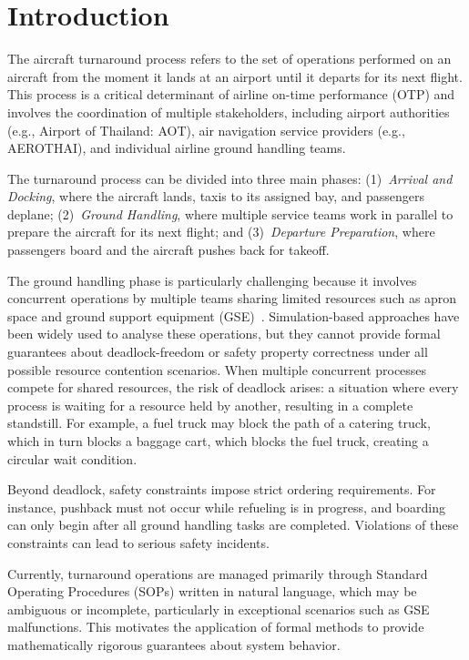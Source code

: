 \documentclass[conference]{IEEEtran}
\begin{document}
\section{Introduction}

The aircraft turnaround process refers to the set of operations performed on an
aircraft from the moment it lands at an airport until it departs for its next
flight. This process is a critical determinant of airline on-time performance
(OTP) and involves the coordination of multiple stakeholders, including airport
authorities (e.g., Airport of Thailand: AOT), air navigation service providers
(e.g., AEROTHAI), and individual airline ground handling teams.

The turnaround process can be divided into three main phases: (1)~\textit{Arrival
and Docking}, where the aircraft lands, taxis to its assigned bay, and passengers
deplane; (2)~\textit{Ground Handling}, where multiple service teams work in
parallel to prepare the aircraft for its next flight; and (3)~\textit{Departure
Preparation}, where passengers board and the aircraft pushes back for takeoff.

The ground handling phase is particularly challenging because it involves
concurrent operations by multiple teams sharing limited resources such as
apron space and ground support equipment (GSE)~\cite{b1,b2}. Simulation-based
approaches have been widely used to analyse these operations, but they cannot
provide formal guarantees about deadlock-freedom or safety property correctness
under all possible resource contention scenarios. When multiple concurrent
processes compete for shared resources, the risk of deadlock arises: a situation
where every process is waiting for a resource held by another, resulting in a
complete standstill. For example, a fuel truck may block the path of a catering
truck, which in turn blocks a baggage cart, which blocks the fuel truck, creating
a circular wait condition.

Beyond deadlock, safety constraints impose strict ordering requirements. For
instance, pushback must not occur while refueling is in progress, and boarding
can only begin after all ground handling tasks are completed. Violations
of these constraints can lead to serious safety incidents.

Currently, turnaround operations are managed primarily through Standard
Operating Procedures (SOPs) written in natural language, which may be ambiguous
or incomplete, particularly in exceptional scenarios such as GSE
malfunctions. This motivates the application of formal methods to
provide mathematically rigorous guarantees about system behavior.
\end{document}
